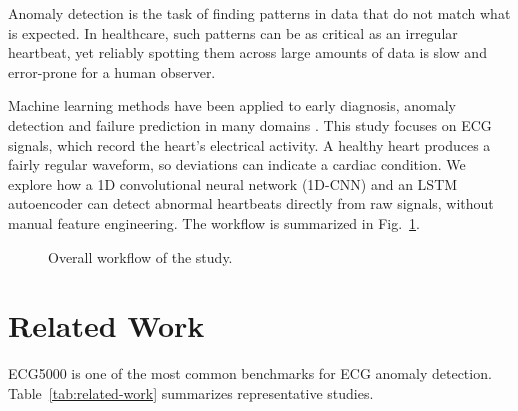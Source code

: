 \documentclass[conference]{IEEEtran}
\begin{document}
Anomaly detection is the task of finding patterns in data that do not match what is expected. In healthcare, such patterns can be as critical as an irregular heartbeat, yet reliably spotting them across large amounts of data is slow and error-prone for a human observer.

Machine learning methods have been applied to early diagnosis, anomaly detection and failure prediction in many domains \citep{sarker2021}. This study focuses on ECG signals, which record the heart's electrical activity. A healthy heart produces a fairly regular waveform, so deviations can indicate a cardiac condition. We explore how a 1D convolutional neural network (1D-CNN) and an LSTM autoencoder can detect abnormal heartbeats directly from raw signals, without manual feature engineering. The workflow is summarized in Fig.~\ref{fig:workflow}.

\begin{figure}[H]
    \centering
    \caption{Overall workflow of the study.}
    \label{fig:workflow}
\end{figure}

\section{Related Work}

ECG5000 is one of the most common benchmarks for ECG anomaly detection. Table~\ref{tab:related-work} summarizes representative studies.
\end{document}
